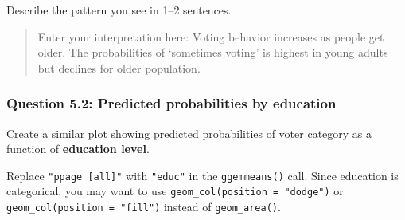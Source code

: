 \documentclass[
  letterpaper,
  DIV=11,
  numbers=noendperiod]{scrartcl}
\begin{document}
Describe the pattern you see in 1--2 sentences.

\begin{quote}
Enter your interpretation here: Voting behavior increases as people get
older. The probabilities of `sometimes voting' is highest in young
adults but declines for older population.
\end{quote}

\subsubsection*{Question 5.2: Predicted probabilities by
education}\label{question-5.2-predicted-probabilities-by-education}

Create a similar plot showing predicted probabilities of voter category
as a function of \textbf{education level}.

\begin{tcolorbox}[enhanced jigsaw, toprule=.15mm, opacitybacktitle=0.6, coltitle=black, opacityback=0, bottomrule=.15mm, left=2mm, colframe=quarto-callout-tip-color-frame, leftrule=.75mm, toptitle=1mm, colbacktitle=quarto-callout-tip-color!10!white, rightrule=.15mm, colback=white, title=\textcolor{quarto-callout-tip-color}{\faLightbulb}\hspace{0.5em}{Hint}, arc=.35mm, bottomtitle=1mm, titlerule=0mm, breakable]

Replace \texttt{"ppage\ {[}all{]}"} with \texttt{"educ"} in the
\texttt{ggemmeans()} call. Since education is categorical, you may want
to use \texttt{geom\_col(position\ =\ "dodge")} or
\texttt{geom\_col(position\ =\ "fill")} instead of
\texttt{geom\_area()}.

\end{tcolorbox}
\end{document}
